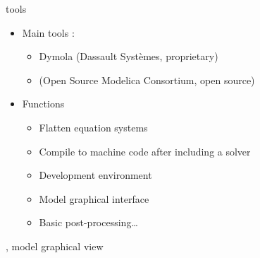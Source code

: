 \documentclass{beamer}
\begin{document}
\begin{frame}{\lmodelica{} tools}
  \begin{itemize}
  \item Main tools :
    \begin{itemize}
    \item Dymola (Dassault Systèmes, proprietary)
    \item \openmodelica{} (Open Source Modelica Consortium, open source)
  \end{itemize}
\vfill
  \item Functions
    \begin{itemize}
    \item Flatten equation systems
    \item Compile to machine code after including a solver
    \item Development environment
    \item Model graphical interface
    \item Basic post-processing\ldots
    \end{itemize}
  \end{itemize}
\end{frame}

\begin{frame}{\openmodelica{}, model graphical view}
\end{frame}

\newcommand{\inout}[3]{%
  \foreach \x in {0,1,...,#2} \coordinate (#1 in \x) at ($\x/#2 *(#1.south west) +  1 - \x/#2 *(#1.north west)$);
  \foreach \y in {0,1,...,#3} \coordinate (#1 out \y) at ($\y/#3 *(#1.south east) +  1 - \y/#3 *(#1.north east)$);
}\newcommand{\inmod}[4][1cm]{\draw[link, reverse] (#2 in #3)--++(-#1, 0) node[pos=.5, above] {#4};}
\newcommand{\outmod}[4][1cm]{\draw[link] (#2 out #3)--++(#1, 0) node[pos=.5, above] {#4};}
\end{document}
